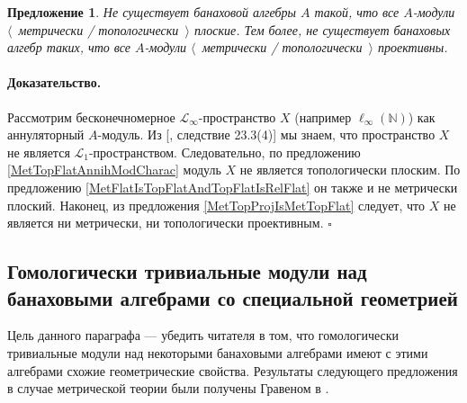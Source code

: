 \documentclass[12pt]{article}
\newtheorem{proposition}[theorem]{Предложение}
\renewenvironment{proof}{\paragraph{Доказательство.}}{\hfill$\square$\medskip}
\begin{document}
\begin{proposition} Не существует банаховой алгебры $A$ такой, что все $A$-модули $\langle$~метрически / топологически~$\rangle$ плоские. Тем более, не существует банаховых алгебр таких, что все $A$-модули $\langle$~метрически / топологически~$\rangle$ проективны.
\end{proposition}
\begin{proof} Рассмотрим бесконечномерное $\mathscr{L}_\infty$-пространство $X$ (например $\ell_\infty(\mathbb{N})$) как аннуляторный $A$-модуль. Из [\cite{DefFloTensNorOpId}, следствие 23.3(4)] мы знаем, что пространство $X$ не является $\mathscr{L}_1$-пространством. Следовательно, по предложению \ref{MetTopFlatAnnihModCharac} модуль $X$ не является топологически плоским. По предложению \ref{MetFlatIsTopFlatAndTopFlatIsRelFlat} он также и не метрически плоский. Наконец, из предложения \ref{MetTopProjIsMetTopFlat} следует, что $X$ не является ни метрически, ни топологически проективным.
\end{proof}


\subsection{Гомологически тривиальные модули над банаховыми алгебрами со специальной геометрией}
\label{SubSectionHomologicallyTrivialModulesOverBanachAlgebrasWithSpecificGeometry}

Цель данного параграфа --- убедить читателя в том, что гомологически тривиальные модули над некоторыми банаховыми алгебрами имеют с этими алгебрами схожие геометрические свойства. Результаты следующего предложения в случае метрической теории были получены Гравеном в \cite{GravInjProjBanMod}.
\end{document}
